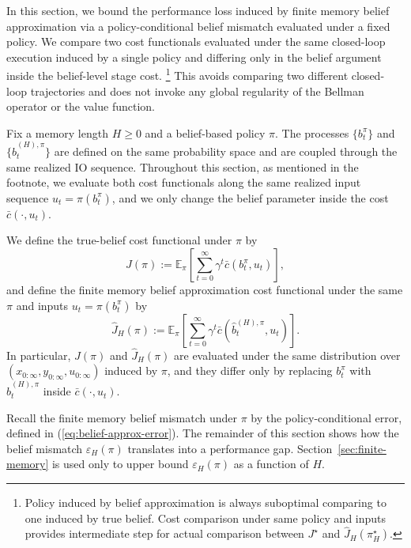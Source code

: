 \documentclass[letterpaper, 10 pt, conference]{ieeeconf}
\begin{document}
In this section, we bound the performance loss induced by finite memory belief approximation via a policy-conditional belief mismatch evaluated under a fixed policy.
We compare two cost functionals evaluated under the same closed-loop execution induced by a single policy and differing only in the belief argument inside the belief-level stage cost.
\footnote{Policy induced by belief approximation is always suboptimal comparing to one induced by true belief. Cost comparison under same policy and inputs provides intermediate step for actual comparison between $J^\star$ and $\hat{J}_H(\pi_H^\star)$.}
This avoids comparing two different closed-loop trajectories and does not invoke any global regularity of the Bellman operator or the value function.

Fix a memory length $H\ge 0$ and a belief-based policy $\pi$.
The processes $\{b_t^\pi\}$ and $\{\hat b_t^{(H),\pi}\}$ are defined on the same probability space and are coupled through the same realized IO sequence.
Throughout this section, as mentioned in the footnote, we evaluate both cost functionals along the same realized input sequence $u_t=\pi(b_t^\pi)$, and we only change the belief parameter inside the cost $\bar c(\cdot,u_t)$.

We define the true-belief cost functional under $\pi$ by
\begin{equation}
\label{eq:true-belief-cost}
J(\pi) := \mathbb{E}_\pi\!\left[ \sum_{t=0}^\infty \gamma^t \bar c\!\left(b_t^\pi,u_t\right) \right],
\end{equation}
and define the finite memory belief approximation cost functional under the same $\pi$ and inputs $u_t=\pi(b_t^\pi)$ by
\begin{equation}
\label{eq:approx-belief-cost}
\hat J_H(\pi) := \mathbb{E}_\pi\!\left[ \sum_{t=0}^\infty \gamma^t \bar c\!\left(\hat b_t^{(H),\pi},u_t\right) \right].
\end{equation}
In particular, $J(\pi)$ and $\hat J_H(\pi)$ are evaluated under the same distribution over $(x_{0:\infty},y_{0:\infty},u_{0:\infty})$ induced by $\pi$, and they differ only by replacing $b_t^\pi$ with $\hat b_t^{(H),\pi}$ inside $\bar c(\cdot,u_t)$.

Recall the finite memory belief mismatch under $\pi$ by the policy-conditional error, defined in (\ref{eq:belief-approx-error}).
The remainder of this section shows how the belief mismatch $\varepsilon_H(\pi)$ translates into a performance gap. Section~\ref{sec:finite-memory} is used only to upper bound $\varepsilon_H(\pi)$ as a function of $H$.
\end{document}
